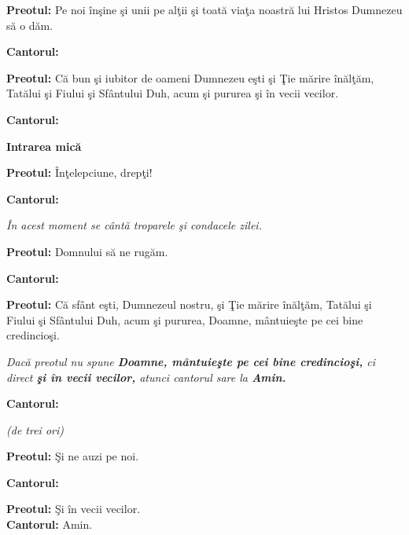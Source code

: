 \documentclass[11pt,letterpaper]{book} \usepackage{ucs}
\newcommand{\mysection}[1]{\begin{center}{\Large \bf #1}\end{center}}
\begin{document}

  {\bf Preotul:} Pe noi înşine şi unii pe alţii şi toată viaţa noastră
  lui Hristos Dumnezeu să o dăm.

  {\bf Cantorul:}
  \begin{center}
  \end{center}

  {\bf Preotul:} Că bun şi iubitor de oameni Dumnezeu eşti şi Ţie
  mărire înălţăm, Tatălui şi Fiului şi Sfântului Duh, acum şi pururea
  şi în vecii vecilor.

  {\bf Cantorul:}
  \begin{center}
  \end{center}

  \pagebreak

  \mysection{Intrarea mică}

  {\bf Preotul:} Înţelepciune, drepţi!

  {\bf Cantorul:}

  \begin{center}
    {\em În acest moment se cântă troparele şi condacele zilei.}
  \end{center}

  {\bf Preotul:} Domnului să ne rugăm.

  {\bf Cantorul:}
  \begin{center}
  \end{center}

  {\bf Preotul:} Că sfânt eşti, Dumnezeul nostru, şi Ţie mărire
  înălţăm, Tatălui şi Fiului şi Sfântului Duh, acum şi pururea, Doamne,
  mântuieşte pe cei bine credincioşi.

  {\em Dacă preotul nu spune {\bf Doamne, mântuieşte pe cei bine
  credincioşi,} ci direct {\bf şi în vecii vecilor,} atunci cantorul
  sare la {\bf Amin.}}
  \pagebreak

  {\bf Cantorul:}

  \begin{center}
    {\em (de trei ori)}
  \end{center}

  {\bf Preotul:} Şi ne auzi pe noi.

  {\bf Cantorul:}


  {\bf Preotul:} Şi în vecii vecilor.\\
  {\bf Cantorul:} Amin.
\end{document}
